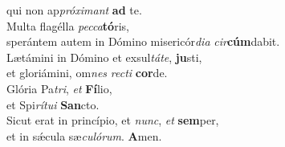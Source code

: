 \evenverse qui non ap\textit{pró}\textit{xi}\textit{mant} \textbf{ad} te.\\
\oddverse Multa flagélla \textit{pec}\textit{ca}\textbf{tó}ris,~\*\\
\oddverse sperántem autem in Dómino misericór\textit{di}\textit{a} \textit{cir}\textbf{cúm}dabit.\\
\evenverse Lætámini in Dómino et exsul\textit{tá}\textit{te}, \textbf{ju}sti,~\*\\
\evenverse et gloriámini, om\textit{nes} \textit{re}\textit{cti} \textbf{cor}de.\\
\oddverse Glória Pa\textit{tri}, \textit{et} \textbf{Fí}lio,~\*\\
\oddverse et Spi\textit{rí}\textit{tu}\textit{i} \textbf{San}cto.\\
\evenverse Sicut erat in princípio, et \textit{nunc}, \textit{et} \textbf{sem}per,~\*\\
\evenverse et in sǽcula sæ\textit{cu}\textit{ló}\textit{rum}. \textbf{A}men.\\
